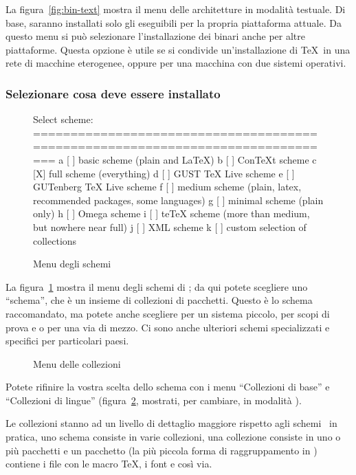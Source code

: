 \documentclass{article}
\begin{document}
La figura~\ref{fig:bin-text} mostra il menu delle architetture in modalità
testuale. Di base, saranno installati solo gli eseguibili per la propria
piattaforma attuale. Da questo menu si può selezionare l'installazione
dei binari anche per altre piattaforme. Questa opzione è utile se si
condivide un'installazione di \TeX\ in una rete di macchine eterogenee,
oppure per una macchina con due sistemi operativi.

\subsubsection{Selezionare cosa deve essere installato}
\label{sec:components}

\begin{figure}[tbh]
\begin{boxedverbatim}
Select scheme:
===============================================================================
 a [ ] basic scheme (plain and LaTeX)
 b [ ] ConTeXt scheme
 c [X] full scheme (everything)
 d [ ] GUST TeX Live scheme
 e [ ] GUTenberg TeX Live scheme
 f [ ] medium scheme (plain, latex, recommended packages, some languages)
 g [ ] minimal scheme (plain only)
 h [ ] Omega scheme
 i [ ] teTeX scheme (more than medium, but nowhere near full)
 j [ ] XML scheme
 k [ ] custom selection of collections
\end{boxedverbatim}
\caption{Menu degli schemi}\label{fig:scheme-text}
\end{figure}

La figura~\ref{fig:scheme-text} mostra il menu degli schemi di \TL; da qui
potete scegliere uno ``schema'', che è un insieme di collezioni di pacchetti.
Questo è lo schema raccomandato, ma potete anche scegliere 
per un sistema piccolo,  per scopi di prova e
 o  per una via di mezzo. Ci sono anche
ulteriori schemi specializzati e specifici per particolari paesi.

\begin{figure}[tbh]
\caption{Menu delle collezioni}\label{fig:collections-gui}
\end{figure}

Potete rifinire la vostra scelta dello schema con i menu ``Collezioni di
base'' e ``Collezioni di lingue'' (figura~\ref{fig:collections-gui},
mostrati, per cambiare, in modalità \GUI).

Le collezioni stanno ad un livello di dettaglio maggiore rispetto agli
schemi \Dash\ in pratica, uno schema consiste in varie collezioni, una
collezione consiste in uno o più pacchetti e un pacchetto (la più piccola
forma di raggruppamento in \TL) contiene i file con le macro \TeX, i font
e così via.
\end{document}
